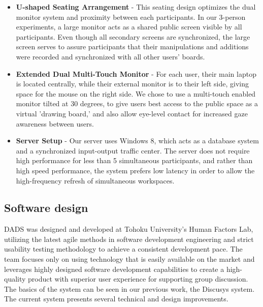 \documentclass{sigchi}
\begin{document}
\begin{itemize}

\item \textbf{U-shaped Seating Arrangement} - This seating design optimizes the dual monitor system and proximity between each participants. In our 3-person experiments, a large monitor acts as a shared public screen visible by all participants. Even though all secondary screens are synchronized, the large screen serves to assure participants that their manipulations and additions were recorded and synchronized with all other users' boards. 
\item \textbf{Extended Dual Multi-Touch Monitor} - For each user, their main laptop is located centrally, while their external monitor is to their left side, giving space for the mouse on the right side. We chose to use a multi-touch enabled monitor tilted at 30 degrees, to give users best access to the public space as a virtual 'drawing board,' and also allow eye-level contact for increased gaze awareness between users. 
\item \textbf{Server Setup} - Our server uses Windows 8, which acts as a database system and a synchronized input-output traffic center. The server does not require high performance for less than 5 simultaneous participants, and rather than high speed performance, the system prefers low latency in order to allow the high-frequency refresh of simultaneous workspaces.
\end{itemize}



\subsection{Software design}

DADS was designed and developed at Tohoku University's Human Factors Lab, utilizing the latest agile methods in software development engineering and strict usability testing methodology to achieve a consistent development pace. The team focuses only on using technology that is easily available on the market and leverages highly designed software development capabilities to create a high-quality product with superior user experience for supporting group discussion. The basics of the system can be seen in our previous work, the Discusys system\cite{widjaja2013discusys}. The current system presents several technical and design improvements.
\end{document}
